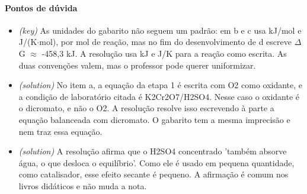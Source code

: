\documentclass{article}%
\begin{document}
\paragraph{Pontos de dúvida}%
\begin{itemize}%
\item%
\textit{(key)} As unidades do gabarito não seguem um padrão: em b e c usa kJ/mol e J/(K$\cdot$mol), por mol de reação, mas no fim do desenvolvimento de d escreve $\Delta$G $\approx$ -458,3 kJ. A resolução usa kJ e J/K para a reação como escrita. As duas convenções valem, mas o professor pode querer uniformizar.%
\item%
\textit{(solution)} No item a, a equação da etapa 1 é escrita com O2 como oxidante, e a condição de laboratório citada é K2Cr2O7/H2SO4. Nesse caso o oxidante é o dicromato, e não o O2. A resolução resolve isso escrevendo à parte a equação balanceada com dicromato. O gabarito tem a mesma imprecisão e nem traz essa equação.%
\item%
\textit{(solution)} A resolução afirma que o H2SO4 concentrado 'também absorve água, o que desloca o equilíbrio'. Como ele é usado em pequena quantidade, como catalisador, esse efeito secante é pequeno. A afirmação é comum nos livros didáticos e não muda a nota.%
\end{itemize}%
\end{document}
